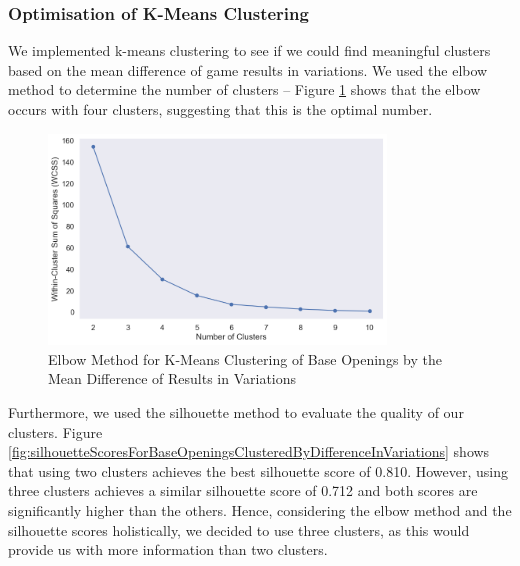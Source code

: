 \documentclass[a4paper, 11pt]{article}
\begin{document}
\subsubsection{Optimisation of K-Means Clustering}
We implemented k-means clustering to see if we could find meaningful clusters based on the mean difference of game results in variations. We used the elbow method to determine the number of clusters -- Figure \ref{fig:elbowMethodForBaseOpeningsClusteredByDifferenceInVariations} shows that the elbow occurs with four clusters, suggesting that this is the optimal number.

\begin{figure}[H]
    \centering
    \caption{Elbow Method for K-Means Clustering of Base Openings by the Mean Difference of Results in Variations}
    \label{fig:elbowMethodForBaseOpeningsClusteredByDifferenceInVariations}
    \includegraphics[width=0.8\textwidth]{Elbow Method for Clustering of Base Opening by Difference in Variations.png}
\end{figure}

Furthermore, we used the silhouette method to evaluate the quality of our clusters. Figure \ref{fig:silhouetteScoresForBaseOpeningsClusteredByDifferenceInVariations} shows that using two clusters achieves the best silhouette score of 0.810. However, using three clusters achieves a similar silhouette score of 0.712 and both scores are significantly higher than the others. Hence, considering the elbow method and the silhouette scores holistically, we decided to use three clusters, as this would provide us with more information than two clusters.
\end{document}
